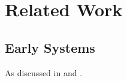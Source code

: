 \documentclass{article}
\begin{document}
\section{Related Work}\label{sec:related}
\subsection{Early Systems}\label{sub:early}
As discussed in  and .
\end{document}
